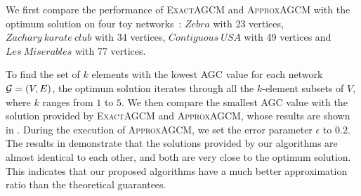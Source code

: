 \documentclass[10pt,journal,compsoc,twocolumn,twoside]{IEEEtran}
\begin{document}
We first compare the performance of \textsc{ExactAGCM} and \textsc{ApproxAGCM} with the optimum solution on four toy networks~\cite{Ku13}: \(\mathit{Zebra}\) with 23 vertices, \(\mathit{Zachary\ karate\ club}\) with 34 vertices, \(\mathit{Contiguous\ USA}\) with 49 vertices and \(\mathit{Les\ Miserables}\) with 77 vertices.

To find the set of \(k\) elements with the lowest AGC value for each network \(\mathcal{G}=(V,E)\), the optimum solution iterates through all the \(k\)-element subsets of \(V\), where \(k\) ranges from \(1\) to \(5\).
We then compare the smallest AGC value with the solution provided by \textsc{ExactAGCM} and \textsc{ApproxAGCM}, whose results are shown in .
During the execution of \textsc{ApproxAGCM}, we set the error parameter \(\epsilon\) to \(0.2\).
The results in  demonstrate that the solutions provided by our algorithms are almost identical to each other, and both are very close to the optimum solution.
This indicates that our proposed algorithms have a much better approximation ratio than the theoretical guarantees.
\end{document}
